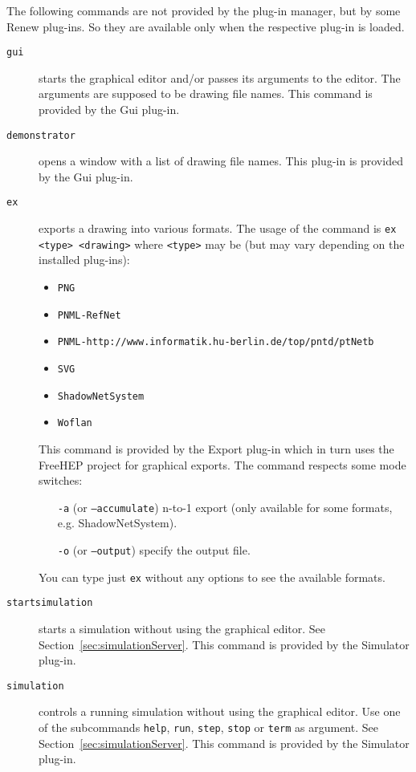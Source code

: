The following commands are not provided by the plug-in manager,
but by some Renew plug-ins.
So they are available only when the respective plug-in is loaded.
\begin{description}
\item[\texttt{gui}]
  starts the graphical editor and/or passes its arguments to the
  editor. 
  The arguments are supposed to be drawing file names.
  This command is provided by the Gui plug-in.
\item[\texttt{demonstrator}] opens a window with a list of drawing
  file names. This plug-in is provided by the Gui plug-in.
\item[\texttt{ex}] exports a drawing into various formats. The usage
  of the command is \texttt{ex <type> <drawing>} where
  \texttt{<type>} may be (but may vary
  depending on the installed plug-ins):
  \begin{itemize}
  \item \texttt{PNG}
  \item \texttt{PNML-RefNet}
  \item \texttt{PNML-http://www.informatik.hu-berlin.de/top/pntd/ptNetb}
  \item \texttt{SVG}
  \item \texttt{ShadowNetSystem}
  \item \texttt{Woflan}
  \end{itemize} 
  This command is provided by the Export plug-in which
  in turn uses the FreeHEP project for graphical exports. The command respects some mode switches:
    \begin{itemize}
  \item[\texttt{-a}] (or \texttt{--accumulate}) n-to-1 export (only available for some formats, e.g. ShadowNetSystem).  
  \item[\texttt{-o}] (or \texttt{--output}) specify the output file.
  \end{itemize}
  You can type just \texttt{ex} without any options to see the available formats.
\item[\texttt{startsimulation}]
  starts a simulation without using the graphical editor. 
  See Section~\ref{sec:simulationServer}.
  This command is provided by the Simulator plug-in.
\item[\texttt{simulation}]
  controls a running simulation without using the graphical
  editor.
  Use one of the subcommands \texttt{help}, \texttt{run},
  \texttt{step}, \texttt{stop} or \texttt{term} as argument.
  See Section~\ref{sec:simulationServer}.
  This command is provided by the Simulator plug-in.

\end{description}
